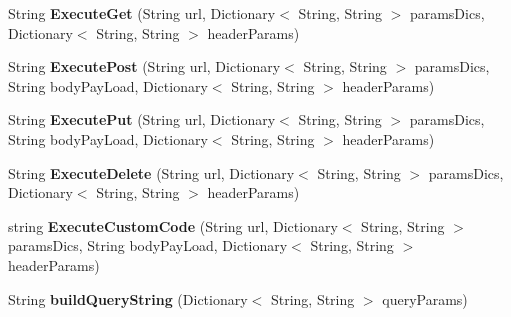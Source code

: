 \begin{DoxyCompactItemize}
\item 
\hypertarget{classcom_1_1shephertz_1_1app42_1_1paas_1_1sdk_1_1csharp_1_1connection_1_1_r_e_s_t_connector_async_a90801b184832fabd4b5c734aba6aecde}{String {\bfseries Execute\+Get} (String url, Dictionary$<$ String, String $>$ params\+Dics, Dictionary$<$ String, String $>$ header\+Params)}\label{classcom_1_1shephertz_1_1app42_1_1paas_1_1sdk_1_1csharp_1_1connection_1_1_r_e_s_t_connector_async_a90801b184832fabd4b5c734aba6aecde}

\item 
\hypertarget{classcom_1_1shephertz_1_1app42_1_1paas_1_1sdk_1_1csharp_1_1connection_1_1_r_e_s_t_connector_async_a1c748198495d8579536bedac70f669e7}{String {\bfseries Execute\+Post} (String url, Dictionary$<$ String, String $>$ params\+Dics, String body\+Pay\+Load, Dictionary$<$ String, String $>$ header\+Params)}\label{classcom_1_1shephertz_1_1app42_1_1paas_1_1sdk_1_1csharp_1_1connection_1_1_r_e_s_t_connector_async_a1c748198495d8579536bedac70f669e7}

\item 
\hypertarget{classcom_1_1shephertz_1_1app42_1_1paas_1_1sdk_1_1csharp_1_1connection_1_1_r_e_s_t_connector_async_a1d67cc19d6c9a489ea77b73a049f0516}{String {\bfseries Execute\+Put} (String url, Dictionary$<$ String, String $>$ params\+Dics, String body\+Pay\+Load, Dictionary$<$ String, String $>$ header\+Params)}\label{classcom_1_1shephertz_1_1app42_1_1paas_1_1sdk_1_1csharp_1_1connection_1_1_r_e_s_t_connector_async_a1d67cc19d6c9a489ea77b73a049f0516}

\item 
\hypertarget{classcom_1_1shephertz_1_1app42_1_1paas_1_1sdk_1_1csharp_1_1connection_1_1_r_e_s_t_connector_async_a85c3a22aa16bbf3df126d18e2ff7d38a}{String {\bfseries Execute\+Delete} (String url, Dictionary$<$ String, String $>$ params\+Dics, Dictionary$<$ String, String $>$ header\+Params)}\label{classcom_1_1shephertz_1_1app42_1_1paas_1_1sdk_1_1csharp_1_1connection_1_1_r_e_s_t_connector_async_a85c3a22aa16bbf3df126d18e2ff7d38a}

\item 
\hypertarget{classcom_1_1shephertz_1_1app42_1_1paas_1_1sdk_1_1csharp_1_1connection_1_1_r_e_s_t_connector_async_af28e1d40df241736308f13eaf94c0aee}{string {\bfseries Execute\+Custom\+Code} (String url, Dictionary$<$ String, String $>$ params\+Dics, String body\+Pay\+Load, Dictionary$<$ String, String $>$ header\+Params)}\label{classcom_1_1shephertz_1_1app42_1_1paas_1_1sdk_1_1csharp_1_1connection_1_1_r_e_s_t_connector_async_af28e1d40df241736308f13eaf94c0aee}

\item 
\hypertarget{classcom_1_1shephertz_1_1app42_1_1paas_1_1sdk_1_1csharp_1_1connection_1_1_r_e_s_t_connector_async_afbe8c8590286f98a96e944d9b7814796}{String {\bfseries build\+Query\+String} (Dictionary$<$ String, String $>$ query\+Params)}\label{classcom_1_1shephertz_1_1app42_1_1paas_1_1sdk_1_1csharp_1_1connection_1_1_r_e_s_t_connector_async_afbe8c8590286f98a96e944d9b7814796}

\end{DoxyCompactItemize}
